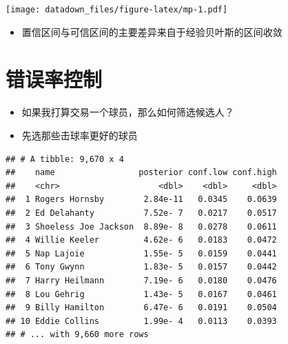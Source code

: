 \documentclass[]{book}
\newenvironment{Shaded}{\begin{snugshade}}{\end{snugshade}}
\newcommand{\CommentTok}[1]{\textcolor[rgb]{0.56,0.35,0.01}{\textit{#1}}}
\newcommand{\KeywordTok}[1]{\textcolor[rgb]{0.13,0.29,0.53}{\textbf{#1}}}
\newcommand{\NormalTok}[1]{#1}
\newcommand{\OperatorTok}[1]{\textcolor[rgb]{0.81,0.36,0.00}{\textbf{#1}}}
\newcommand{\StringTok}[1]{\textcolor[rgb]{0.31,0.60,0.02}{#1}}
\providecommand{\tightlist}{%
  \setlength{\itemsep}{0pt}\setlength{\parskip}{0pt}}
\begin{document}
\texttt{[image: datadown\_files/figure-latex/mp-1.pdf]}

\begin{itemize}
\tightlist
\item
  置信区间与可信区间的主要差异来自于经验贝叶斯的区间收敛
\end{itemize}

\hypertarget{ux9519ux8befux7387ux63a7ux5236}{%
\section{错误率控制}\label{ux9519ux8befux7387ux63a7ux5236}}

\begin{itemize}
\item
  如果我打算交易一个球员，那么如何筛选候选人？
\item
  先选那些击球率更好的球员
\end{itemize}

\begin{Shaded}
\end{Shaded}

\begin{verbatim}
## # A tibble: 9,670 x 4
##    name                 posterior conf.low conf.high
##    <chr>                    <dbl>    <dbl>     <dbl>
##  1 Rogers Hornsby        2.84e-11   0.0345    0.0639
##  2 Ed Delahanty          7.52e- 7   0.0217    0.0517
##  3 Shoeless Joe Jackson  8.89e- 8   0.0278    0.0611
##  4 Willie Keeler         4.62e- 6   0.0183    0.0472
##  5 Nap Lajoie            1.55e- 5   0.0159    0.0441
##  6 Tony Gwynn            1.83e- 5   0.0157    0.0442
##  7 Harry Heilmann        7.19e- 6   0.0180    0.0476
##  8 Lou Gehrig            1.43e- 5   0.0167    0.0461
##  9 Billy Hamilton        6.47e- 6   0.0191    0.0504
## 10 Eddie Collins         1.99e- 4   0.0113    0.0393
## # ... with 9,660 more rows
\end{verbatim}
\end{document}
